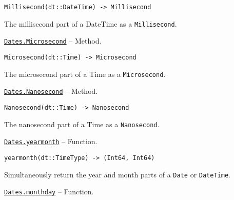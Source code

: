 \begin{adjustwidth}{2em}{0pt}


\begin{verbatim}
Millisecond(dt::DateTime) -> Millisecond
\end{verbatim}

The millisecond part of a DateTime as a \texttt{Millisecond}.



\end{adjustwidth}
\hypertarget{4155472013117853166}{}
\hyperlink{4155472013117853166}{\texttt{Dates.Microsecond}}  -- {Method.}

\begin{adjustwidth}{2em}{0pt}


\begin{verbatim}
Microsecond(dt::Time) -> Microsecond
\end{verbatim}

The microsecond part of a Time as a \texttt{Microsecond}.



\end{adjustwidth}
\hypertarget{14345635682555926790}{}
\hyperlink{14345635682555926790}{\texttt{Dates.Nanosecond}}  -- {Method.}

\begin{adjustwidth}{2em}{0pt}


\begin{verbatim}
Nanosecond(dt::Time) -> Nanosecond
\end{verbatim}

The nanosecond part of a Time as a \texttt{Nanosecond}.



\end{adjustwidth}
\hypertarget{1408650772715600889}{}
\hyperlink{1408650772715600889}{\texttt{Dates.yearmonth}}  -- {Function.}

\begin{adjustwidth}{2em}{0pt}


\begin{verbatim}
yearmonth(dt::TimeType) -> (Int64, Int64)
\end{verbatim}

Simultaneously return the year and month parts of a \texttt{Date} or \texttt{DateTime}.



\end{adjustwidth}
\hypertarget{17847736901982891967}{}
\hyperlink{17847736901982891967}{\texttt{Dates.monthday}}  -- {Function.}

